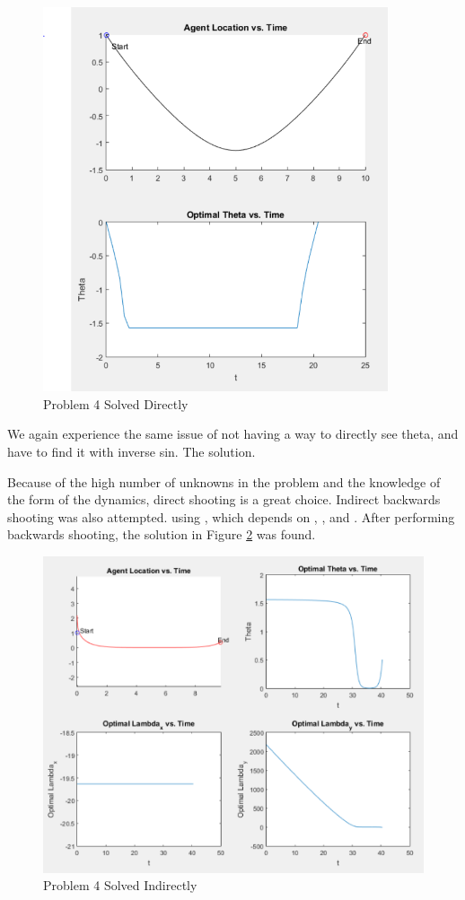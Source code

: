 \documentclass[12pt,letterpaper]{article}
\begin{document}
\begin{figure}[!h]
\centering
\includegraphics[width=4in]{prob4direct.png}
\caption{Problem 4 Solved Directly}
\label{fig:prob4direct}
\end{figure}

We again experience the same issue of not having a way to directly see theta, and have to find it with inverse sin. The solution.

Because of the high number of unknowns in the problem and the knowledge of the form of the dynamics, direct shooting is a great choice. Indirect backwards shooting was also attempted. using , which depends on , , and . After performing backwards shooting, the solution in Figure \ref{fig:prob4indirect} was found.

\begin{figure}[!h]
\centering
\includegraphics[width=5in]{prob4indirect.png}
\caption{Problem 4 Solved Indirectly}
\label{fig:prob4indirect}
\end{figure}
\end{document}
